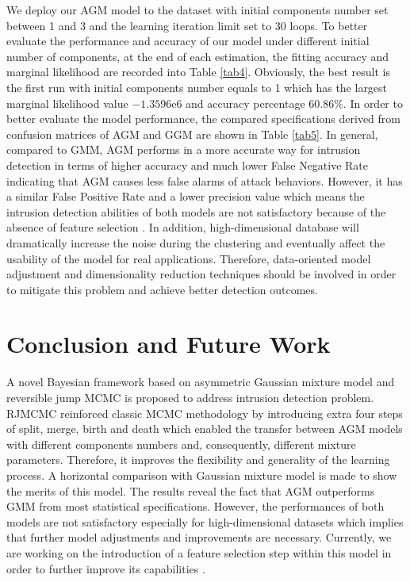 \documentclass[conference]{IEEEtran}
\begin{document}
We deploy our AGM model to the dataset with initial components number set between 1 and 3 and the learning iteration limit set to 30 loops. To better evaluate the performance and accuracy of our model under different initial number of components, at the end of each estimation, the fitting accuracy and marginal likelihood\cite{Bouguila2009} are recorded into Table \ref{tab4}. Obviously, the best result is the first run with initial components number equals to 1 which has the largest marginal likelihood value $-1.3596\mathrm{e}{6}$ and accuracy percentage 60.86\%. In order to better evaluate the model performance, the compared specifications derived from confusion matrices of AGM and GGM are shown in Table \ref{tab5}. In general, compared to GMM, AGM performs in a more accurate way for intrusion detection in terms of higher accuracy and much lower False Negative Rate indicating that AGM causes less false alarms of attack behaviors. However, it has a similar False Positive Rate and a lower precision value which means the intrusion detection abilities of both models are not satisfactory because of the absence of feature selection \cite{Bouguila2012b,Sheikhpour2017,Boutemedjet2007}. In addition, high-dimensional database will dramatically increase the noise during the clustering and eventually affect the usability of the model for real applications. Therefore, data-oriented model adjustment and dimensionality reduction techniques should be involved in order to mitigate this problem and achieve better detection outcomes.

\section{Conclusion and Future Work}
A novel Bayesian framework based on asymmetric Gaussian mixture model and reversible jump MCMC is proposed to address intrusion detection problem. RJMCMC reinforced classic MCMC methodology by introducing extra four steps of split, merge, birth and death which enabled the transfer between AGM models with different components numbers and, consequently, different mixture parameters. Therefore, it improves the flexibility and generality of the learning process. A horizontal comparison with Gaussian mixture model is made to show the merits of this model. The results reveal the fact that AGM outperforms GMM from most statistical specifications. However, the performances of both models are not satisfactory especially for high-dimensional datasets which implies that further model adjustments and improvements are necessary. Currently, we are working on the introduction of a feature selection step within this model in order to further improve its capabilities \cite{Fan2011,Fan2013,Bouguila2009b,Boutemedjet2010,Bouguila2012a}.
\end{document}
